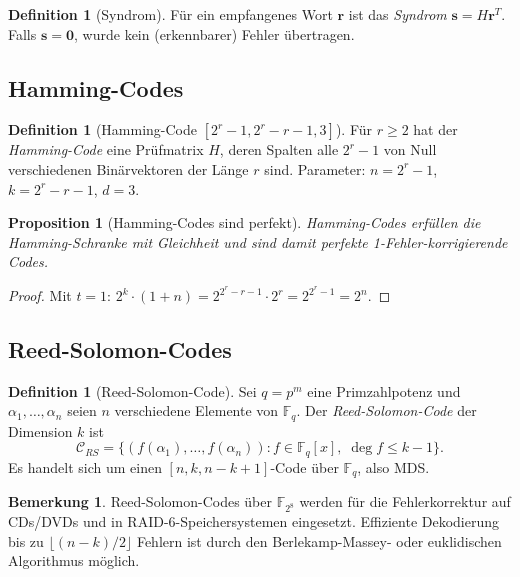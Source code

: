 \documentclass[12pt,a4paper]{amsart}
\newtheorem{proposition}[theorem]{Proposition}
\theoremstyle{definition}
\newtheorem{definition}[theorem]{Definition}
\newtheorem{bemerkung}[theorem]{Bemerkung}
\theoremstyle{remark}
\begin{document}
\begin{definition}[Syndrom]
Für ein empfangenes Wort $\mathbf{r}$ ist das \emph{Syndrom}
$\mathbf{s} = H\mathbf{r}^T$. Falls $\mathbf{s} = \mathbf{0}$, wurde kein
(erkennbarer) Fehler übertragen.
\end{definition}

\subsection{Hamming-Codes}

\begin{definition}[Hamming-Code {$[2^r-1, 2^r-r-1, 3]$}]
Für $r \geq 2$ hat der \emph{Hamming-Code} eine Prüfmatrix $H$, deren Spalten
alle $2^r - 1$ von Null verschiedenen Binärvektoren der Länge $r$ sind. Parameter:
$n = 2^r - 1$, $k = 2^r - r - 1$, $d = 3$.
\end{definition}

\begin{proposition}[Hamming-Codes sind perfekt]
Hamming-Codes erfüllen die Hamming-Schranke mit Gleichheit und sind damit
perfekte 1-Fehler-korrigierende Codes.
\end{proposition}
\begin{proof}
Mit $t=1$: $2^k \cdot (1 + n) = 2^{2^r-r-1} \cdot 2^r = 2^{2^r-1} = 2^n$.
\end{proof}

\subsection{Reed-Solomon-Codes}

\begin{definition}[Reed-Solomon-Code]
Sei $q = p^m$ eine Primzahlpotenz und $\alpha_1,\ldots,\alpha_n$ seien $n$
verschiedene Elemente von $\mathbb{F}_q$. Der \emph{Reed-Solomon-Code} der
Dimension $k$ ist
\[
  \mathcal{C}_{RS} = \bigl\{(f(\alpha_1),\ldots,f(\alpha_n)) :
  f \in \mathbb{F}_q[x],\; \deg f \leq k-1\bigr\}.
\]
Es handelt sich um einen $[n, k, n-k+1]$-Code über $\mathbb{F}_q$, also MDS.
\end{definition}

\begin{bemerkung}
Reed-Solomon-Codes über $\mathbb{F}_{2^8}$ werden für die Fehlerkorrektur auf
CDs/DVDs und in RAID-6-Speichersystemen eingesetzt. Effiziente Dekodierung bis
zu $\lfloor(n-k)/2\rfloor$ Fehlern ist durch den Berlekamp-Massey- oder
euklidischen Algorithmus möglich.
\end{bemerkung}
\end{document}
